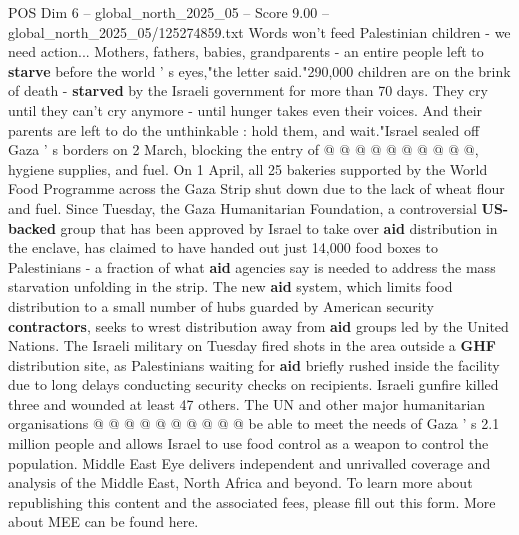 \begin{textsample}{POS Dim 6 – global\_north\_2025\_05 – Score 9.00 – global\_north\_2025\_05/125274859.txt}
Words won't feed Palestinian children - we need action...
Mothers, fathers, babies, grandparents - an entire people left to \textbf{starve} before the world ' s eyes,"the letter said."290,000 children are on the brink of death - \textbf{starved} by the Israeli government for more than 70 days.
They cry until they can't cry anymore - until hunger takes even their voices.
And their parents are left to do the unthinkable : hold them, and wait."Israel sealed off Gaza ' s borders on 2 March, blocking the entry of @ @ @ @ @ @ @ @ @ @, hygiene supplies, and fuel.
On 1 April, all 25 bakeries supported by the World Food Programme across the Gaza Strip shut down due to the lack of wheat flour and fuel.
Since Tuesday, the Gaza Humanitarian Foundation, a controversial \textbf{US-backed} group that has been approved by Israel to take over \textbf{aid} distribution in the enclave, has claimed to have handed out just 14,000 food boxes to Palestinians - a fraction of what \textbf{aid} agencies say is needed to address the mass starvation unfolding in the strip.
The new \textbf{aid} system, which limits food distribution to a small number of hubs guarded by American security \textbf{contractors}, seeks to wrest distribution away from \textbf{aid} groups led by the United Nations.
The Israeli military on Tuesday fired shots in the area outside a \textbf{GHF} distribution site, as Palestinians waiting for \textbf{aid} briefly rushed inside the facility due to long delays conducting security checks on recipients.
Israeli gunfire killed three and wounded at least 47 others.
The UN and other major humanitarian organisations @ @ @ @ @ @ @ @ @ @ be able to meet the needs of Gaza ' s 2.1 million people and allows Israel to use food control as a weapon to control the population.
Middle East Eye delivers independent and unrivalled coverage and analysis of the Middle East, North Africa and beyond.
To learn more about republishing this content and the associated fees, please fill out this form.
More about MEE can be found here.

\end{textsample}
